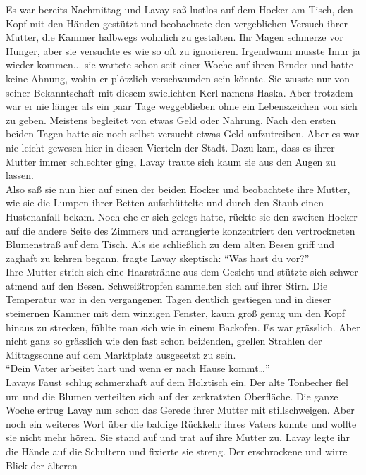 Es war bereits Nachmittag und Lavay saß lustlos auf dem Hocker am Tisch, den Kopf mit den Händen 
gestützt und beobachtete den vergeblichen Versuch ihrer Mutter, die Kammer halbwegs wohnlich zu 
gestalten. Ihr Magen schmerze vor Hunger, aber sie versuchte es wie so oft zu ignorieren. 
Irgendwann musste Imur ja wieder kommen... sie wartete schon seit einer Woche auf ihren Bruder 
und hatte keine Ahnung, wohin er plötzlich verschwunden sein könnte. Sie wusste nur von seiner 
Bekanntschaft mit diesem zwielichten Kerl namens Haska. Aber trotzdem war er nie länger als ein 
paar Tage weggeblieben ohne ein Lebenszeichen von sich zu geben. Meistens begleitet von etwas 
Geld oder Nahrung. Nach den ersten beiden Tagen hatte sie noch selbst versucht etwas Geld 
aufzutreiben. Aber es war nie leicht gewesen hier in diesen Vierteln der Stadt. Dazu kam, dass 
es ihrer Mutter immer schlechter ging, Lavay traute sich kaum sie aus den Augen zu lassen.\\
Also saß sie nun hier auf einen der beiden Hocker und beobachtete ihre Mutter, wie sie die 
Lumpen ihrer Betten aufschüttelte und durch den Staub einen Hustenanfall bekam. Noch ehe er sich 
gelegt hatte, rückte sie den zweiten Hocker auf die andere Seite des Zimmers und arrangierte 
konzentriert den vertrockneten Blumenstraß auf dem Tisch. Als sie schließlich zu dem alten Besen 
griff und zaghaft zu kehren begann, fragte Lavay skeptisch: ``Was hast du vor?''\\
Ihre Mutter strich sich eine Haarsträhne aus dem Gesicht und stützte sich schwer atmend auf den 
Besen. Schweißtropfen sammelten sich auf ihrer Stirn. Die Temperatur war in den vergangenen Tagen 
deutlich gestiegen und in dieser steinernen Kammer mit dem winzigen Fenster, kaum groß genug um den 
Kopf hinaus zu strecken, fühlte man sich wie in einem Backofen. Es war grässlich. Aber nicht ganz 
so grässlich wie den fast schon beißenden, grellen Strahlen der Mittagssonne auf dem Marktplatz 
ausgesetzt zu sein. \\
``Dein Vater arbeitet hart und wenn er nach Hause kommt…''\\
Lavays Faust schlug schmerzhaft auf dem Holztisch ein. Der alte Tonbecher fiel um und die Blumen 
verteilten sich auf der zerkratzten Oberfläche. Die ganze Woche ertrug Lavay nun schon das Gerede 
ihrer Mutter mit stillschweigen. Aber noch ein weiteres Wort über die baldige Rückkehr ihres Vaters 
konnte und wollte sie nicht mehr hören. Sie stand auf und trat auf ihre Mutter zu. Lavay legte ihr 
die Hände auf die Schultern und fixierte sie streng. Der erschrockene und wirre Blick der älteren 
